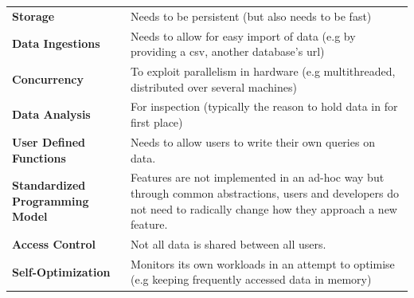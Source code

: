 \begin{center}
    \begingroup
    \setlength{\tabcolsep}{10pt} %
    \renewcommand{\arraystretch}{1.5} %
    \begin{tabular}{p{} p{}}
        \textbf{Storage}                                 & Needs to be persistent (but also needs to be fast)                                                                                                                   \\
        \textbf{Data Ingestions}                         & Needs to allow for easy import of data (e.g by providing a csv, another database's url)                                                                              \\
        \textbf{Concurrency}                             & To exploit parallelism in hardware (e.g multithreaded, distributed over several machines)                                                                            \\
        \textbf{Data Analysis}                           & For inspection (typically the reason to hold data in for first place)                                                                                                \\
        \textbf{User Defined Functions}                  & Needs to allow users to write their own queries on data.                                                                                                             \\
        \textbf{Standardized \newline Programming Model} & Features are not implemented in an ad-hoc way but through common abstractions, users and developers do not need to radically change how they approach a new feature. \\
        \textbf{Access Control}                          & Not all data is shared between all users.                                                                                                                            \\
        \textbf{Self-Optimization}                       & Monitors its own workloads in an attempt to optimise (e.g keeping frequently accessed data in memory)                                                                \\
    \end{tabular}
    \endgroup
\end{center}

